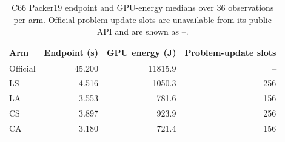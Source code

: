 \begin{table}[t]\centering
\caption{C66 Packer19 endpoint and GPU-energy medians over 36 observations per arm. Official problem-update slots are unavailable from its public API and are shown as --.}
\label{tab:c66-packer-endpoint-energy}
\begin{tabular}{lrrr}\toprule
Arm & Endpoint (s) & GPU energy (J) & Problem-update slots \\\midrule
Official & 45.200 & 11815.9 & -- \\
LS & 4.516 & 1050.3 & 256 \\
LA & 3.553 & 781.6 & 156 \\
CS & 3.897 & 923.9 & 256 \\
CA & 3.180 & 721.4 & 156 \\
\bottomrule
\end{tabular}
\end{table}

